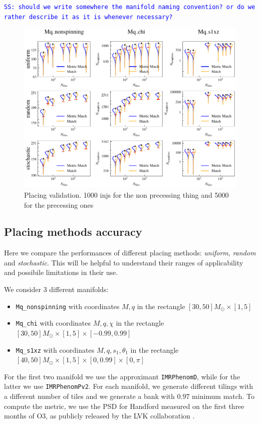 \documentclass[twocolumn,showpacs,preprintnumbers,nofootinbib,prd,
superscriptaddress,10pt]{revtex4-1}
\newcommand{\stefano}[1]{{\textcolor{blue}{\texttt{SS: #1}} }}
\begin{document}
\stefano{should we write somewhere the manifold naming convention? or do we rather describe it as it is whenever necessary?}

\begin{figure}[t!]
	\centering
	\includegraphics[width=.75\textwidth,keepaspectratio]{placing_validation}
	\caption{Placing validation. 1000 injs for the non precessing thing and 5000 for the precessing ones}
	\label{fig:placing_validation}
\end{figure}

\subsection{Placing methods accuracy} \label{sec:placing_accuracy}

Here we compare the performances of different placing methods: \textit{uniform}, \textit{random} and \textit{stochastic}.
This will be helpful to understand their ranges of applicability and possibile limitations in their use.

We consider 3 different manifolds:
\begin{itemize}
	\item \texttt{Mq\_nonspinning} with coordinates $M, q$ in the rectangle $[30, 50] M_\odot \times [1,5]$
	\item \texttt{Mq\_chi} with coordinates $M, q, \chi $ in the rectangle $[30, 50] M_\odot \times [1,5] \times [-0.99, 0.99]$
	\item \texttt{Mq\_s1xz} with coordinates $M, q, s_{1}, \theta_1$ in the rectangle $[40, 50] M_\odot \times [1,5] \times [0, 0.99] \times [0,\pi]$
\end{itemize}
For the first two manifold we use the approximant \texttt{IMRPhenomD}, while for the latter we use \texttt{IMRPhenomPv2}.
For each manifold, we generate different tilings with a different number of tiles and we generate a bank with $0.97$ minimum match.
To compute the metric, we use the PSD for Handford measured on the first three months of O3, as publicly released by the LVK collaboration \cite{https://dcc.ligo.org/LIGO-T2000012/public}.
\end{document}
